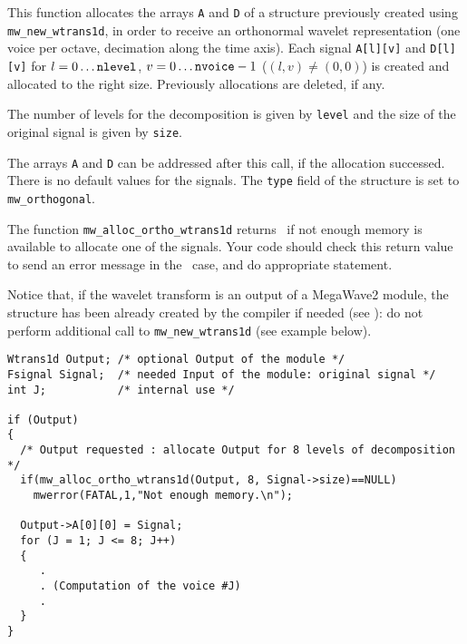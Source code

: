 \newpage %

\Description
This function allocates the arrays \verb+A+ and \verb+D+ of a \wtransud structure previously created using \verb+mw_new_wtrans1d+, in order to receive
an orthonormal wavelet representation (one voice per octave, decimation along the time axis).
Each signal \verb+A[l][v]+ and \verb+D[l][v]+ for $l=0 \ldots \mbox{{\tt nlevel}}$, $v=0 \ldots \mbox{{\tt nvoice}}-1$ ($(l,v) \not = (0,0)$) is created and
allocated to the right size.
Previously allocations are deleted, if any.

The number of levels for the decomposition is given by \verb+level+ and the
size of the original signal is given by \verb+size+.

The arrays \verb+A+ and \verb+D+ can be addressed after this call, if the allocation successed. There is no default values for the signals.
The \verb+type+ field of the \wtransud structure is set to \verb+mw_orthogonal+.

The function \verb+mw_alloc_ortho_wtrans1d+ returns \Null\ if not enough memory is available to allocate one of the signals. 
Your code should check this return value to send an error message in the \Null\ case, and do appropriate statement.

Notice that, if the wavelet transform is an output of a MegaWave2 module, the structure has been already created by the compiler if needed (see \volI): do not perform additional call to \verb+mw_new_wtrans1d+ (see example below).

\Next
\Example
\begin{verbatim}
Wtrans1d Output; /* optional Output of the module */
Fsignal Signal;  /* needed Input of the module: original signal */
int J;           /* internal use */

if (Output) 
{
  /* Output requested : allocate Output for 8 levels of decomposition */
  if(mw_alloc_ortho_wtrans1d(Output, 8, Signal->size)==NULL)
    mwerror(FATAL,1,"Not enough memory.\n");
  
  Output->A[0][0] = Signal;
  for (J = 1; J <= 8; J++)
  {
     .
     . (Computation of the voice #J)
     .
  }
}
\end{verbatim}

